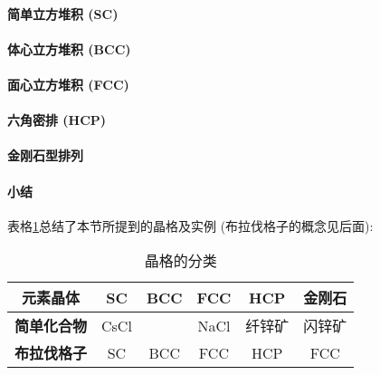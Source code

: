         \paragraph{简单立方堆积 (SC) \\}

        \paragraph{体心立方堆积 (BCC) \\}

        \paragraph{面心立方堆积 (FCC) \\}

        \paragraph{六角密排 (HCP) \\}

        \paragraph{金刚石型排列 \\}

        \paragraph{小结 \\}
            \hspace*{2em} 表格\ref{tab: 晶格的分类}总结了本节所提到的晶格及实例 (布拉伐格子的概念见后面):

                \begin{table}[H]
                    \caption{晶格的分类}\label{tab: 晶格的分类}

                    \centering
                    \begin{tabular}{|c|c|c|c|c|c|}
                        \hline
                        \textbf{元素晶体}   & SC   & BCC & FCC  & HCP    & 金刚石 \\ \hline
                        \textbf{简单化合物} & CsCl &     & NaCl & 纤锌矿 & 闪锌矿 \\ \hline
                        \textbf{布拉伐格子} & SC   & BCC & FCC  & HCP    & FCC \\ \hline
                    \end{tabular}
                \end{table}

